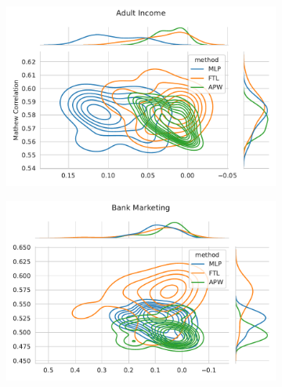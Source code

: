 \begin{figure}
\centering
\caption{Metric distribution optimizing MCC and Equal Opportunity in comparison with Fair Transition Loss across multiple resample runs. Corresponding values available at Table~\ref{tab:complete_mcc_opportunity}.}
\label{fig:complete_mcc_opportunity}
\begin{subfigure}{.45\linewidth}
    \includegraphics[width=1\linewidth]{images/pareto_mcc_opportunity_adult.pdf}
\end{subfigure}
\begin{subfigure}{.45\linewidth}
    \includegraphics[width=1\linewidth]{images/pareto_mcc_opportunity_bank.pdf}
\end{subfigure}


\end{figure}
